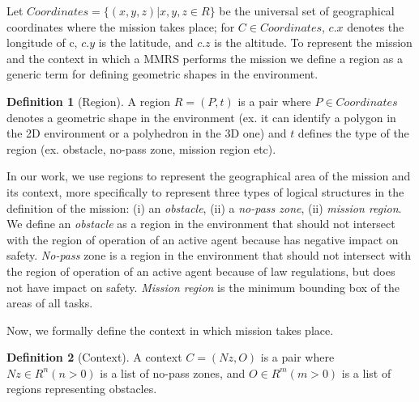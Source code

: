 \documentclass[journal]{IEEEtran}
\theoremstyle{definition}
\newtheorem{definition}{Definition}
\newcommand\ivano[1]{\nb{Ivano}{#1}}
\begin{document}
Let $Coordinates = \{(x,y,z) | x,y,z \in R\}$  be the universal set of geographical coordinates where the mission takes place; for $C \in Coordinates$, $c.x$ denotes the longitude of c, $c.y$ is the latitude,
and $c.z$ is the altitude. 
To represent the mission and the context in which a MMRS performs the mission we define a region as a generic term for defining geometric shapes in the environment. 

\begin{definition}[Region]
A region $R=(P, t)$ is a pair where $P \in Coordinates$ 
denotes a geometric shape in the environment (ex. it can identify a polygon in the 2D environment or a polyhedron in the 3D one) and $t$  defines the type of the region (ex. obstacle,  no-pass zone, mission region etc).
\end{definition}

In our work, we use regions to represent the geographical area of the mission and its context, more specifically to represent three types of logical structures in the definition of the mission: (i) an \textit{obstacle}, (ii) a \textit{no-pass zone}, (ii) \textit{mission region}.
We define an \textit{obstacle} as a region in the environment that should not intersect with the region of operation of an active agent because has negative impact on safety.  \textit{No-pass} zone is a region in the environment that should not intersect with the region of operation of an active agent because of law regulations, but does not have impact on safety.  \textit{Mission region} is the minimum bounding box of the areas of all tasks. 

Now, we formally define the context in which mission takes place.

\begin{definition}[Context]
A context $C=(Nz, O)$ is a pair
where $Nz \in R^n (n>0)$ is a list of no-pass zones, and $O \in R^m (m>0)$
is a list of regions representing obstacles.
\end{definition}
\end{document}
